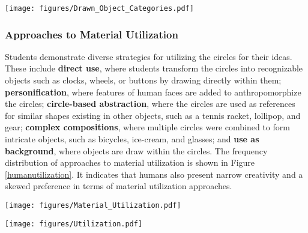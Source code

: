 \begin{figure*}
    \texttt{[image: figures/Drawn\_Object\_Categories.pdf]} %
\end{figure*}

\subsubsection{Approaches to Material Utilization}
Students demonstrate diverse strategies for utilizing the circles for their ideas. These include \textbf{direct use}, where students transform the circles into recognizable objects such as clocks, wheels, or buttons by drawing directly within them; \textbf{personification}, where features of human faces are added to anthropomorphize the circles; \textbf{circle-based abstraction}, where the circles are used as references for similar shapes existing in other objects, such as a tennis racket, lollipop, and gear; \textbf{complex compositions}, where multiple circles were combined to form intricate objects, such as bicycles, ice-cream, and glasses; and \textbf{use as background}, where objects are draw within the circles. The frequency distribution of approaches to material utilization is shown in Figure \ref{humanutilization}. It indicates that humans also present narrow creativity and a skewed preference in terms of material utilization approaches.

\begin{figure*}
    \texttt{[image: figures/Material\_Utilization.pdf]} %
\end{figure*}



\begin{figure*}
    \texttt{[image: figures/Utilization.pdf]} %
    \label{humanutilization}
\end{figure*}

